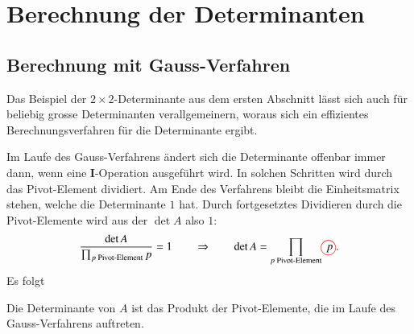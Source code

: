 %
%
%
\section{Berechnung der Determinanten}
\subsection{Berechnung mit Gauss-Verfahren}
Das Beispiel der $2\times 2$-Determinante aus dem ersten Abschnitt
lässt sich auch für beliebig grosse Determinanten verallgemeinern,
woraus sich ein effizientes Berechnungsverfahren für die Determinante
ergibt.

Im Laufe des Gauss-Verfahrens ändert sich die Determinante offenbar
immer dann, wenn eine {\bf I}-Operation ausgeführt wird.
In solchen Schritten wird durch das Pivot-Element dividiert.
Am Ende des 
Verfahrens bleibt die Einheitsmatrix stehen, welche die Determinante
$1$ hat.
Durch fortgesetztes Dividieren durch die Pivot-Elemente wird
aus der $\det A$ also $1$:
\[
\frac{\det A}{\prod_{\text{$p$ Pivot-Element} }p}=1\qquad\Rightarrow
\qquad
\det A=\prod_{\text{$p$ Pivot-Element}} p%
\begin{picture}(0,0)
\color{red}\put(-4,2){\circle{13}}
\end{picture}%
\;.
\]
Es folgt
\begin{satz}
\label{detprodpivot}
Die Determinante von $A$ ist das Produkt der Pivot-Elemente,
die im Laufe des Gauss-Verfahrens auftreten.
\end{satz}

